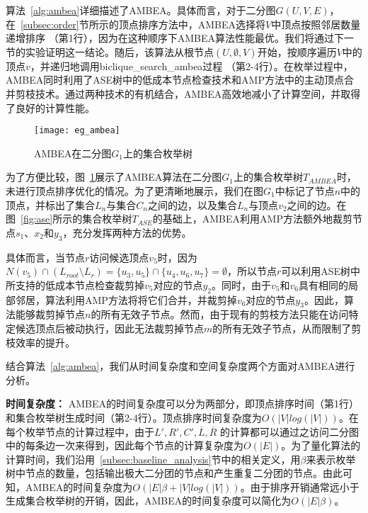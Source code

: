 算法~\ref{alg:ambea}详细描述了AMBEA。具体而言，对于二分图$G(U,V,E)$，在~\ref{subsec:order}节所示的顶点排序方法中，AMBEA选择将$V$中顶点按照邻居数量递增排序 （第1行），因为在这种顺序下AMBEA算法性能最优。我们将通过下一节的实验证明这一结论。随后，该算法从根节点$(U,\emptyset,V)$开始，按顺序遍历$V$中的顶点$v$，并递归地调用\textsf{biclique\_search\_ambea}过程 （第2-4行）。在枚举过程中，AMBEA同时利用了ASE树中的低成本节点检查技术和AMP方法中的主动顶点合并剪枝技术。通过两种技术的有机结合，AMBEA高效地减小了计算空间，并取得了良好的计算性能。

\begin{figure} [H]
	\centering
	
  \texttt{[image: eg\_ambea]}

	\caption{AMBEA在二分图$G_1$上的集合枚举树}
	\label{fig:ambea}
\end{figure}

\begin{example}
  \label{example:ambea}
  为了方便比较，图~\ref{fig:ambea}展示了AMBEA算法在二分图$G_1$上的集合枚举树$T_{AMBEA}$时，未进行顶点排序优化的情况。为了更清晰地展示，我们在图$G_1$中标记了节点$n$中的顶点，并标出了集合$L_n$与集合$C_n$之间的边，以及集合$L_n$与顶点$v_2$之间的边。在图~\ref{fig:ase}所示的集合枚举树$T_{ASE}$的基础上，AMBEA利用AMP方法额外地裁剪节点$s_1$、$x_2$和$y_3$，充分发挥两种方法的优势。

  具体而言，当节点$r$访问候选顶点$v_5$时，因为$N(v_5) \cap (L_{root} \setminus L_r) = \{u_3, u_5\} \cap \{u_4, u_6, u_7\} = \emptyset$，所以节点$r$可以利用ASE树中所支持的低成本节点检查裁剪掉$v_5$对应的节点$y_2$。同时，由于$v_5$和$v_6$具有相同的局部邻居，算法利用AMP方法将将它们合并，并裁剪掉$v_6$对应的节点$y_3$。因此，算法能够裁剪掉节点$n$的所有无效子节点。然而，由于现有的剪枝方法只能在访问特定候选顶点后被动执行，因此无法裁剪掉节点$m$的所有无效子节点，从而限制了剪枝效率的提升。
\end{example}

结合算法~\ref{alg:ambea}，我们从时间复杂度和空间复杂度两个方面对AMBEA进行分析。

\textbf{时间复杂度：} AMBEA的时间复杂度可以分为两部分，即顶点排序时间（第1行）和集合枚举树生成时间（第2-4行）。顶点排序时间复杂度为$O(|V|log(|V|))$。在每个枚举节点的计算过程中，由于$L', R', C',\overline{L},\overline{R}$ 的计算都可以通过之访问二分图中的每条边一次来得到，因此每个节点的计算复杂度为$O(|E|)$。为了量化算法的计算时间，我们沿用~\ref{subsec:baseline_analysis}节中的相关定义，用$\beta$来表示枚举树中节点的数量，包括输出极大二分团的节点和产生重复二分团的节点。由此可知，AMBEA的时间复杂度为$O(|E|\beta + |V|log(|V|))$。由于排序开销通常远小于生成集合枚举树的开销，因此，AMBEA的时间复杂度可以简化为$O(|E|\beta)$。

